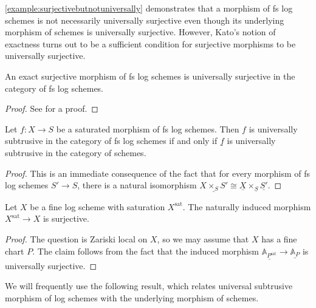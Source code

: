 \documentclass[10pt]{amsart}
\newcommand{\A}{\mathbb{A}}
\newcommand{\sat}{\mathrm{sat}}
\newcommand{\ul}{\underline}
\begin{document}
\cref{example:surjectivebutnotuniversally} demonstrates that a morphism of fs log schemes is 
not necessarily universally surjective even though its underlying morphism of schemes 
is universally surjective. 
However, 
Kato's notion of exactness turns out to be a sufficient condition for surjective morphisms 
to be universally surjective.

\begin{proposition}\label{prop:universallysurjective}
An exact surjective morphism of fs log schemes is universally surjective in the category of fs log schemes. 
\end{proposition}
\begin{proof}
See \cite[Proposition 2.2.2]{MR1457738} for a proof.
\end{proof}

\begin{proposition}\label{prop:saturated}
Let $f\colon X\to S$ be a saturated morphism of fs log schemes.
Then $f$ is universally subtrusive in the category of fs log schemes if and only if 
$\ul{f}$ is universally subtrusive in the category of schemes.
\end{proposition}
\begin{proof}
This is an immediate consequence of the fact that for every morphism of fs log schemes $S'\to S$,
there is a natural isomorphism $\ul{X\times_S S'}\cong \ul{X}\times_{\ul{S}}\ul{S'}$.
\end{proof}

\begin{lemma}
\label{v.1}
Let $X$ be a fine log scheme with saturation $X^\sat$.
The naturally induced morphism $X^\sat\to X$ is surjective.
\end{lemma}
\begin{proof}
The question is Zariski local on $X$,
so we may assume that $X$ has a fine chart $P$.
The claim follows from the fact that the induced morphism $\ul{\A_{P^\sat}}\to \ul{\A_P}$ is universally surjective.
\end{proof}

We will frequently use the following result, 
which relates universal subtrusive morphism of log schemes with the underlying morphism of schemes.
\end{document}
